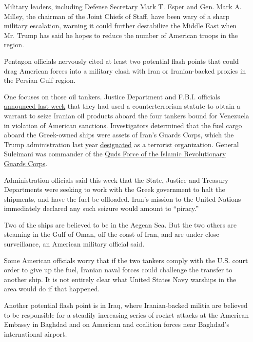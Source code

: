 Military leaders, including Defense Secretary Mark T. Esper and Gen.
Mark A. Milley, the chairman of the Joint Chiefs of Staff, have been
wary of a sharp military escalation, warning it could further
destabilize the Middle East when Mr. Trump has said he hopes to reduce
the number of American troops in the region.

Pentagon officials nervously cited at least two potential flash points
that could drag American forces into a military clash with Iran or
Iranian-backed proxies in the Persian Gulf region.

One focuses on those oil tankers. Justice Department and F.B.I.
officials
\href{https://www.justice.gov/opa/pr/warrant-and-complaint-seek-seizure-all-iranian-gasoil-aboard-four-tankers-headed-venezuela}{announced
last week} that they had used a counterterrorism statute to obtain a
warrant to seize Iranian oil products aboard the four tankers bound for
Venezuela in violation of American sanctions. Investigators determined
that the fuel cargo aboard the Greek-owned ships were assets of Iran's
Guards Corps, which the Trump administration last year
\href{https://www.nytimes.com/2019/04/08/world/middleeast/trump-iran-revolutionary-guard-corps.html}{designated}
as a terrorist organization. General Suleimani was commander of the
\href{https://www.nytimes.com/2020/01/03/world/middleeast/suleimani-dead.html}{Quds
Force of the Islamic Revolutionary Guards Corps}.

Administration officials said this week that the State, Justice and
Treasury Departments were seeking to work with the Greek government to
halt the shipments, and have the fuel be offloaded. Iran's mission to
the United Nations immediately declared any such seizure would amount to
``piracy.''

Two of the ships are believed to be in the Aegean Sea. But the two
others are steaming in the Gulf of Oman, off the coast of Iran, and are
under close surveillance, an American military official said.

Some American officials worry that if the two tankers comply with the
U.S. court order to give up the fuel, Iranian naval forces could
challenge the transfer to another ship. It is not entirely clear what
United States Navy warships in the area would do if that happened.

Another potential flash point is in Iraq, where Iranian-backed militia
are believed to be responsible for a steadily increasing series of
rocket attacks at the American Embassy in Baghdad and on American and
coalition forces near Baghdad's international airport.


